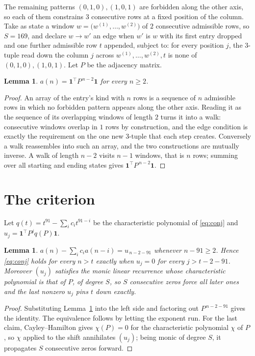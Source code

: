 \documentclass[11pt,a4paper]{article}
\theoremstyle{plain}
\newtheorem{lemma}[theorem]{Lemma}
\theoremstyle{definition}
\begin{document}
The remaining patterns $(0,1,0), (1,0,1)$ are forbidden along the other axis, so each of them
constrains $3$ consecutive rows at a fixed position of the column. Take as state a
window $w=\bigl(w^{(1)},\dots,w^{(2)}\bigr)$ of $2$ consecutive admissible
rows, so $S=169$, and declare $w\to w'$ an edge when $w'$ is $w$ with its first entry
dropped and one further admissible row $t$ appended, subject to: for every position
$j$, the $3$-tuple read down the column $j$ across $w^{(1)},\dots,w^{(2)},t$
is none of $(0,1,0), (1,0,1)$. Let $P$ be the adjacency matrix.

\begin{lemma}\label{lem:walk}
$a(n)=\mathbf{1}^{\!\top}P^{\,n-2}\mathbf{1}$ for every $n\ge2$.
\end{lemma}

\begin{proof}
An array of the entry's kind with $n$ rows is a sequence of $n$ admissible rows in
which no forbidden pattern appears along the other axis. Reading it as the sequence of its
overlapping windows of length $2$ turns it into a walk: consecutive windows overlap in
$1$ rows by construction, and the edge condition is exactly the requirement on the one
new $3$-tuple that each step creates. Conversely a walk reassembles into such an array,
and the two constructions are mutually inverse. A walk of length $n-2$ visits $n-1$
windows, that is $n$ rows; summing over all starting and ending states gives
$\mathbf{1}^{\!\top}P^{\,n-2}\mathbf{1}$.
\end{proof}

\section{The criterion}

Let $q(t)=t^{91}-\sum_i c_i t^{91-i}$ be the characteristic polynomial of
\eqref{eq:conj} and $u_j=\mathbf{1}^{\!\top}P^{j}q(P)\mathbf{1}$.

\begin{lemma}\label{lem:crit}
$a(n)-\sum_i c_i a(n-i)=u_{\,n-2-91}$ whenever $n-91\ge2$. Hence
\eqref{eq:conj} holds for every $n>t$ exactly when $u_j=0$ for every
$j>t-2-91$. Moreover $(u_j)$ satisfies the monic linear recurrence whose
characteristic polynomial is that of $P$, of degree $S$, so $S$ consecutive zeros force all
later ones and the last nonzero $u_j$ pins $t$ down exactly.
\end{lemma}

\begin{proof}
Substituting Lemma~\ref{lem:walk} into the left side and factoring out
$P^{\,n-2-91}$ gives the identity. The equivalence follows by letting the exponent
run. For the last claim, Cayley--Hamilton gives $\chi(P)=0$ for the characteristic
polynomial $\chi$ of $P$, so $\chi$ applied to the shift annihilates $(u_j)$; being monic of
degree $S$, it propagates $S$ consecutive zeros forward.
\end{proof}
\end{document}
